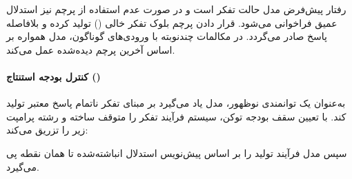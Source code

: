 \begin{table}[htbp]
\centering
\caption{قالب تبادل پیام در فاز ادغام حالات تفکر }
\label{tab:qwen3_chat_templates}
\end{table}

رفتار پیش‌فرض مدل حالت تفکر است و در صورت عدم استفاده از پرچم  نیز استدلال عمیق فراخوانی می‌شود. قرار دادن پرچم  بلوک تفکر خالی () تولید کرده و بلافاصله پاسخ صادر می‌گردد. در مکالمات چندنوبته با ورودی‌های گوناگون، مدل همواره بر اساس آخرین پرچم دیده‌شده عمل می‌کند.

\paragraph*{کنترل بودجه استنتاج ()}
به‌عنوان یک توانمندی نوظهور، مدل یاد می‌گیرد بر مبنای تفکر ناتمام پاسخ معتبر تولید کند. با تعیین سقف بودجه توکن، سیستم فرآیند تفکر را متوقف ساخته و رشته پرامپت زیر را تزریق می‌کند:
\begin{center}
\end{center}
سپس مدل فرآیند تولید را بر اساس پیش‌نویس استدلال انباشته‌شده تا همان نقطه پی می‌گیرد.

